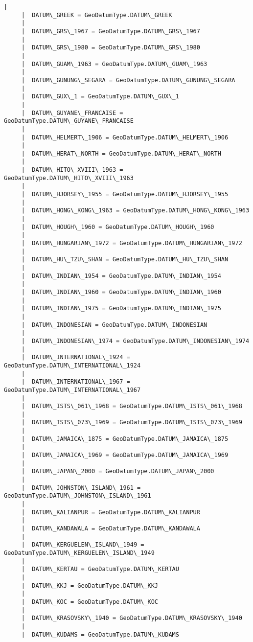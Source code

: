 \documentclass[11pt]{article}
\begin{document}
\begin{Verbatim}[commandchars=\\\{\}]
     |  
     |  DATUM\_GREEK = GeoDatumType.DATUM\_GREEK
     |  
     |  DATUM\_GRS\_1967 = GeoDatumType.DATUM\_GRS\_1967
     |  
     |  DATUM\_GRS\_1980 = GeoDatumType.DATUM\_GRS\_1980
     |  
     |  DATUM\_GUAM\_1963 = GeoDatumType.DATUM\_GUAM\_1963
     |  
     |  DATUM\_GUNUNG\_SEGARA = GeoDatumType.DATUM\_GUNUNG\_SEGARA
     |  
     |  DATUM\_GUX\_1 = GeoDatumType.DATUM\_GUX\_1
     |  
     |  DATUM\_GUYANE\_FRANCAISE = GeoDatumType.DATUM\_GUYANE\_FRANCAISE
     |  
     |  DATUM\_HELMERT\_1906 = GeoDatumType.DATUM\_HELMERT\_1906
     |  
     |  DATUM\_HERAT\_NORTH = GeoDatumType.DATUM\_HERAT\_NORTH
     |  
     |  DATUM\_HITO\_XVIII\_1963 = GeoDatumType.DATUM\_HITO\_XVIII\_1963
     |  
     |  DATUM\_HJORSEY\_1955 = GeoDatumType.DATUM\_HJORSEY\_1955
     |  
     |  DATUM\_HONG\_KONG\_1963 = GeoDatumType.DATUM\_HONG\_KONG\_1963
     |  
     |  DATUM\_HOUGH\_1960 = GeoDatumType.DATUM\_HOUGH\_1960
     |  
     |  DATUM\_HUNGARIAN\_1972 = GeoDatumType.DATUM\_HUNGARIAN\_1972
     |  
     |  DATUM\_HU\_TZU\_SHAN = GeoDatumType.DATUM\_HU\_TZU\_SHAN
     |  
     |  DATUM\_INDIAN\_1954 = GeoDatumType.DATUM\_INDIAN\_1954
     |  
     |  DATUM\_INDIAN\_1960 = GeoDatumType.DATUM\_INDIAN\_1960
     |  
     |  DATUM\_INDIAN\_1975 = GeoDatumType.DATUM\_INDIAN\_1975
     |  
     |  DATUM\_INDONESIAN = GeoDatumType.DATUM\_INDONESIAN
     |  
     |  DATUM\_INDONESIAN\_1974 = GeoDatumType.DATUM\_INDONESIAN\_1974
     |  
     |  DATUM\_INTERNATIONAL\_1924 = GeoDatumType.DATUM\_INTERNATIONAL\_1924
     |  
     |  DATUM\_INTERNATIONAL\_1967 = GeoDatumType.DATUM\_INTERNATIONAL\_1967
     |  
     |  DATUM\_ISTS\_061\_1968 = GeoDatumType.DATUM\_ISTS\_061\_1968
     |  
     |  DATUM\_ISTS\_073\_1969 = GeoDatumType.DATUM\_ISTS\_073\_1969
     |  
     |  DATUM\_JAMAICA\_1875 = GeoDatumType.DATUM\_JAMAICA\_1875
     |  
     |  DATUM\_JAMAICA\_1969 = GeoDatumType.DATUM\_JAMAICA\_1969
     |  
     |  DATUM\_JAPAN\_2000 = GeoDatumType.DATUM\_JAPAN\_2000
     |  
     |  DATUM\_JOHNSTON\_ISLAND\_1961 = GeoDatumType.DATUM\_JOHNSTON\_ISLAND\_1961
     |  
     |  DATUM\_KALIANPUR = GeoDatumType.DATUM\_KALIANPUR
     |  
     |  DATUM\_KANDAWALA = GeoDatumType.DATUM\_KANDAWALA
     |  
     |  DATUM\_KERGUELEN\_ISLAND\_1949 = GeoDatumType.DATUM\_KERGUELEN\_ISLAND\_1949
     |  
     |  DATUM\_KERTAU = GeoDatumType.DATUM\_KERTAU
     |  
     |  DATUM\_KKJ = GeoDatumType.DATUM\_KKJ
     |  
     |  DATUM\_KOC = GeoDatumType.DATUM\_KOC
     |  
     |  DATUM\_KRASOVSKY\_1940 = GeoDatumType.DATUM\_KRASOVSKY\_1940
     |  
     |  DATUM\_KUDAMS = GeoDatumType.DATUM\_KUDAMS

\end{Verbatim}
\end{document}
